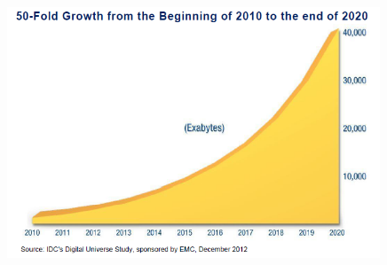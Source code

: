 \documentclass[first=dgreen,second=purple,logo=redexc]{aaltoslides}
\begin{document}
% 
\begin{frame} {} 

\begin{figure}
\centering
  \includegraphics[width=0.99\textwidth]{figures/datagrowth}
\end{figure}

\end{frame}
% 
% 
% 
% 
\end{document}
